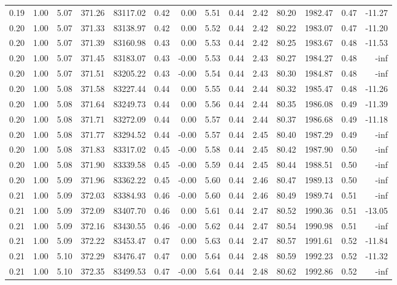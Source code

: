 \begin{table}[!ht]
\begin{tabular}{rrrrrrrrrrrrrr}
0.19 & 1.00 & 5.07 & 371.26 & 83117.02 & 0.42 & 0.00 & 5.51 & 0.44 & 2.42 & 80.20 & 1982.47 & 0.47 & -11.27 \\
0.20 & 1.00 & 5.07 & 371.33 & 83138.97 & 0.42 & 0.00 & 5.52 & 0.44 & 2.42 & 80.22 & 1983.07 & 0.47 & -11.20 \\
0.20 & 1.00 & 5.07 & 371.39 & 83160.98 & 0.43 & 0.00 & 5.53 & 0.44 & 2.42 & 80.25 & 1983.67 & 0.48 & -11.53 \\
0.20 & 1.00 & 5.07 & 371.45 & 83183.07 & 0.43 & -0.00 & 5.53 & 0.44 & 2.43 & 80.27 & 1984.27 & 0.48 & -inf \\
0.20 & 1.00 & 5.07 & 371.51 & 83205.22 & 0.43 & -0.00 & 5.54 & 0.44 & 2.43 & 80.30 & 1984.87 & 0.48 & -inf \\
0.20 & 1.00 & 5.08 & 371.58 & 83227.44 & 0.44 & 0.00 & 5.55 & 0.44 & 2.44 & 80.32 & 1985.47 & 0.48 & -11.26 \\
0.20 & 1.00 & 5.08 & 371.64 & 83249.73 & 0.44 & 0.00 & 5.56 & 0.44 & 2.44 & 80.35 & 1986.08 & 0.49 & -11.39 \\
0.20 & 1.00 & 5.08 & 371.71 & 83272.09 & 0.44 & 0.00 & 5.57 & 0.44 & 2.44 & 80.37 & 1986.68 & 0.49 & -11.18 \\
0.20 & 1.00 & 5.08 & 371.77 & 83294.52 & 0.44 & -0.00 & 5.57 & 0.44 & 2.45 & 80.40 & 1987.29 & 0.49 & -inf \\
0.20 & 1.00 & 5.08 & 371.83 & 83317.02 & 0.45 & -0.00 & 5.58 & 0.44 & 2.45 & 80.42 & 1987.90 & 0.50 & -inf \\
0.20 & 1.00 & 5.08 & 371.90 & 83339.58 & 0.45 & -0.00 & 5.59 & 0.44 & 2.45 & 80.44 & 1988.51 & 0.50 & -inf \\
0.20 & 1.00 & 5.09 & 371.96 & 83362.22 & 0.45 & -0.00 & 5.60 & 0.44 & 2.46 & 80.47 & 1989.13 & 0.50 & -inf \\
0.21 & 1.00 & 5.09 & 372.03 & 83384.93 & 0.46 & -0.00 & 5.60 & 0.44 & 2.46 & 80.49 & 1989.74 & 0.51 & -inf \\
0.21 & 1.00 & 5.09 & 372.09 & 83407.70 & 0.46 & 0.00 & 5.61 & 0.44 & 2.47 & 80.52 & 1990.36 & 0.51 & -13.05 \\
0.21 & 1.00 & 5.09 & 372.16 & 83430.55 & 0.46 & -0.00 & 5.62 & 0.44 & 2.47 & 80.54 & 1990.98 & 0.51 & -inf \\
0.21 & 1.00 & 5.09 & 372.22 & 83453.47 & 0.47 & 0.00 & 5.63 & 0.44 & 2.47 & 80.57 & 1991.61 & 0.52 & -11.84 \\
0.21 & 1.00 & 5.10 & 372.29 & 83476.47 & 0.47 & 0.00 & 5.64 & 0.44 & 2.48 & 80.59 & 1992.23 & 0.52 & -11.32 \\
0.21 & 1.00 & 5.10 & 372.35 & 83499.53 & 0.47 & -0.00 & 5.64 & 0.44 & 2.48 & 80.62 & 1992.86 & 0.52 & -inf \\

\end{tabular}
\end{table}

